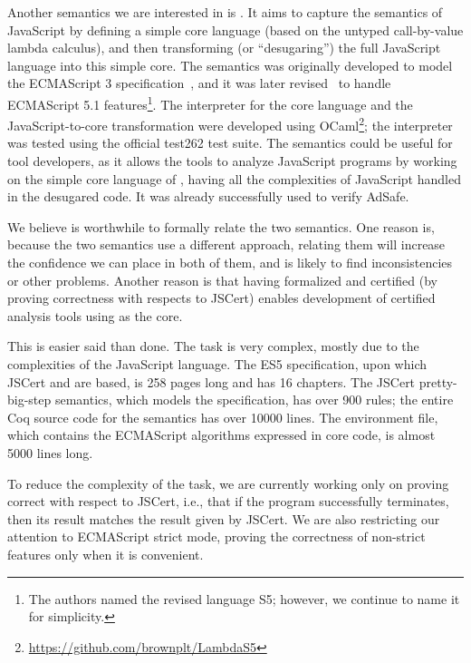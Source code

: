 \documentclass{sigplanconf}
\begin{document}
Another semantics we are interested in is \lambdajs. It aims to capture
the semantics of JavaScript by defining a simple core language
(based on the untyped call-by-value lambda calculus), and then
transforming (or ``desugaring'') the full JavaScript language into this
simple core. The \lambdajs{} semantics was originally developed to model the 
ECMAScript 3 specification~\cite{Guha-al:ECOOP10}, and it was later
revised~\cite{Politz-al:DLS12} to handle ECMAScript 5.1
features\footnote{The authors named the revised language S5; however,
we continue to name it \lambdajs{} for simplicity.}.
The interpreter for the core language and the JavaScript-to-core
transformation were developed using 
OCaml\footnote{\url{https://github.com/brownplt/LambdaS5}};
the interpreter was tested using the official test262 test suite.
The \lambdajs{} semantics could be useful for tool developers, as it
allows the tools to analyze JavaScript programs by working
on the simple core language of \lambdajs, having all the complexities
of JavaScript handled in the desugared code. It was already
successfully used to verify AdSafe. %

We believe is worthwhile to formally relate the two semantics. One reason is,
because the two semantics use a different approach, relating
them will increase the confidence we can place in both of them,
and is likely to find inconsistencies or other problems. Another reason is
that having \lambdajs{} formalized and certified (by proving correctness
with respects to JSCert) enables development of certified analysis tools
using \lambdajs{} as the core.

This is easier said than done. The task is very complex, mostly due
to the complexities of the JavaScript language. The ES5 specification,
upon which JSCert and \lambdajs{} are based, is 258 pages long and 
has 16 chapters. The JSCert pretty-big-step semantics, which models
the specification, has over 900 rules; the entire Coq source code
for the semantics has over 10000 lines. The \lambdajs{} environment
file, which contains the ECMAScript algorithms expressed in core
\lambdajs{} code, is almost 5000 lines long.

To reduce the complexity of the task, we are currently working
only on proving \lambdajs{} correct with respect to JSCert,
i.e., that if the \lambdajs{} program successfully terminates,
then its result matches the result given by JSCert. We are also
restricting our attention to ECMAScript strict mode, proving the
correctness of non-strict features only when it is convenient.
\end{document}
